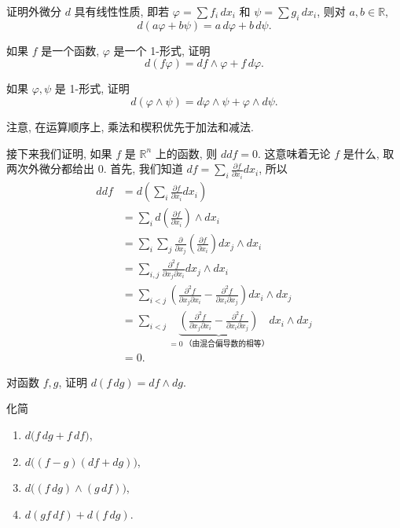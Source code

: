 \begin{question}\label{q:4-15}
证明外微分 $d$ 具有线性性质, 即若 $\varphi=\sum f_i\,dx_i$ 和 $\psi=\sum g_i\,dx_i$, 则对 $a,b\in\mathbb{R}$, 
\[
d(a\varphi+b\psi)=a\,d\varphi+b\,d\psi.
\]
\end{question}

\begin{question}\label{q:4-16}
如果 $f$ 是一个函数, $\varphi$ 是一个 1-形式, 证明
\[
d(f\varphi)=df\wedge\varphi+f\,d\varphi.
\]
\end{question}

\begin{question}\label{q:4-17}
如果 $\varphi,\psi$ 是 1-形式, 证明
\[
d(\varphi\wedge\psi)=d\varphi\wedge\psi+\varphi\wedge d\psi.
\]
\end{question}

注意, 在运算顺序上, 乘法和楔积优先于加法和减法.

接下来我们证明, 如果 $f$ 是 $\mathbb{R}^n$ 上的函数, 则 $ddf=0$. 这意味着无论 $f$ 是什么, 取两次外微分都给出 0. 首先, 我们知道 $df=\sum_i\frac{\partial f}{\partial x_i}dx_i$, 所以
\begin{align*}
ddf&=d\left(\sum_i\frac{\partial f}{\partial x_i}dx_i\right)\\
&=\sum_i d\left(\frac{\partial f}{\partial x_i}\right)\wedge dx_i\\
&=\sum_i\sum_j\frac{\partial}{\partial x_j}\left(\frac{\partial f}{\partial x_i}\right)dx_j\wedge dx_i\\
&=\sum_{i,j}\frac{\partial^2 f}{\partial x_j\partial x_i}dx_j\wedge dx_i\\
&=\sum_{i<j}\left(\frac{\partial^2 f}{\partial x_j\partial x_i}-\frac{\partial^2 f}{\partial x_i\partial x_j}\right)dx_i\wedge dx_j\\
&=\sum_{i<j}\underbrace{\left(\frac{\partial^2 f}{\partial x_j\partial x_i}-\frac{\partial^2 f}{\partial x_i\partial x_j}\right)}_{=0\ \text{（由混合偏导数的相等）}}dx_i\wedge dx_j\\
&=0.
\end{align*}

\begin{question}\label{q:4-18}
对函数 $f,g$, 证明 $d(f\,dg)=df\wedge dg$.
\end{question}

\begin{question}\label{q:4-19}
化简
\begin{enumerate}
  \item[(a)] $d\bigl(f\,dg+f\,df\bigr)$, 
  \item[(b)] $d\bigl((f-g)(df+dg)\bigr)$, 
  \item[(c)] $d\bigl((f\,dg)\wedge(g\,df)\bigr)$, 
  \item[(d)] $d(gf\,df)+d(f\,dg)$.
\end{enumerate}
\end{question}

